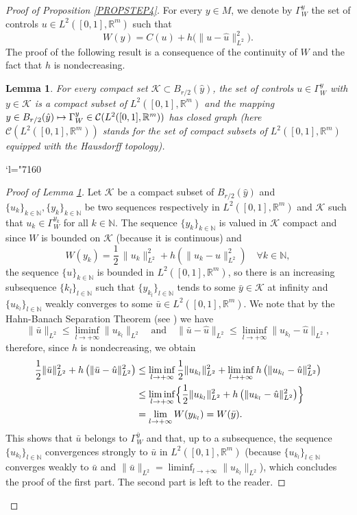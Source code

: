 \documentclass[JEP,XML,SOM,Unicode,NoFloatCountersInSection,published]{cedram}
\newcommand{\Changel}{\mathcode`l="7160}
\newcommand\mto{\mathchoice{\longmapsto}{\mapsto}{\mapsto}{\mapsto}}
\newcommand\R{\mathbb R}
\newcommand\N{\mathbb N}
\newtheorem{lemma}[theorem]{Lemma}
\theoremstyle{definition}
\begin{document}
\begin{proof}[Proof of Proposition \ref{PROPSTEP4}]

For every $y\in M$, we denote by $\Gamma^y_W$ the set of controls $u \in L^2([0,1],\R^m)$ such that
\[
W(y) = C(u) + h\bigl(\|u-\hat{u}\|_{L^2}^2\bigr).
\]
The proof of the following result is a consequence of the continuity of $W$ and the fact that $h$ is nondecreasing.

\begin{lemma}\label{STEP4_LEM1}
For every compact set $\mathcal{K}\subset B_{r/2}(\hat{y})$, the set of controls $u \in \Gamma^y_W$ with $y\in \mathcal{K}$ is a compact subset of $L^{2}([0,1],\R^m)$ and the mapping $y\in B_{r/2}(\hat{y}) \mto \Gamma^y_W \in \mathcal{C}(L^{2}([0,1],\R^m))$ has closed graph (here $\mathcal{C}(L^{2}([0,1],\R^m))$ stands for the set of compact subsets of $L^{2}([0,1],\R^m)$ equipped with the Hausdorff topology).
\end{lemma}

\Changel

\begin{proof}[Proof of Lemma \ref{STEP4_LEM1}]
Let $\mathcal{K}$ be a compact subset of $B_{r/2}(\hat{y})$ and $\{u_k\}_{k\in \N}, \{y_k\}_{k\in \N}$ be two sequences respectively in $L^{2}([0,1],\R^m)$ and $\mathcal{K}$ such that $u_k\in \Gamma_W^{y_k}$ for all $k\in \N$. The sequence $\{y_k\}_{k\in \N}$ is valued in $\mathcal{K}$ compact and since $W$ is bounded on $\mathcal{K}$ (because it is continuous) and
\[
W(y_k) = \frac{1}{2}\, \|u_k\|_{L^2}^2 + h\left(\|u_k-\hat{u}\|_{L^2}^2\right) \quad \forall k\in \N,
\]
the sequence $\{u\}_{k\in \N}$ is bounded in $L^2([0,1],\R^m)$, so there is an increasing subsequence $\{k_l\}_{l\in \N}$ such that $\{y_{k_l}\}_{l\in \N}$ tends to some $\bar{y}\in \mathcal{K}$ at infinity and $\{u_{k_l}\}_{l\in \N}$ weakly converges to some $\bar{u}\in L^{2}([0,1],\R^m)$. We note that by the Hahn-Banach Separation Theorem (see \eg \cite{clarke13}) we have
\[
\|\bar{u}\|_{L^2} \leq \liminf_{l\to +\infty} \|u_{k_l}\|_{L^2} \quad \text{and} \quad \|\bar{u}-\hat{u}\|_{L^2} \leq \liminf_{l\to +\infty} \|u_{k_l}-\hat{u}\|_{L^2},
\]
therefore, since $h$ is nondecreasing, we obtain
\begin{align*}
\frac{1}{2} \|\bar{u}\|_{L^2}^2 + h\left(\|\bar{u}-\hat{u}\|_{L^2}^2\right) & \leq  \liminf_{l\to +\infty} \frac{1}{2} \|u_{k_l}\|_{L^2}^2 + \liminf_{l\to +\infty} h\left(\|u_{k_l}-\hat{u}\|_{L^2}^2\right)\\
& \leq  \liminf_{l\to +\infty} \Bigl\{\frac{1}{2} \|u_{k_l}\|_{L^2}^2 + h\left(\|u_{k_l}-\hat{u}\|_{L^2}^2\right)\Bigr\}\\
& =  \lim_{l\to +\infty} W(y_{k_l}) = W(\bar{y}).
\end{align*}
This shows that $\bar{u}$ belongs to $\Gamma_W^{\bar{y}}$ and that, up to a subsequence, the sequence $\{u_{k_l}\}_{l\in \N}$ convergences strongly to $\bar{u}$ in $L^2([0,1],\R^m)$ (because $\{u_{k_l}\}_{l\in \N}$ converges weakly to $\bar{u}$ and $\|\bar{u}\|_{L^2} = \liminf_{l\to +\infty} \|u_{k_l}\|_{L^2}$), which concludes the proof of the first part. The second part is left to the reader.
\end{proof}


\end{proof}
\end{document}
